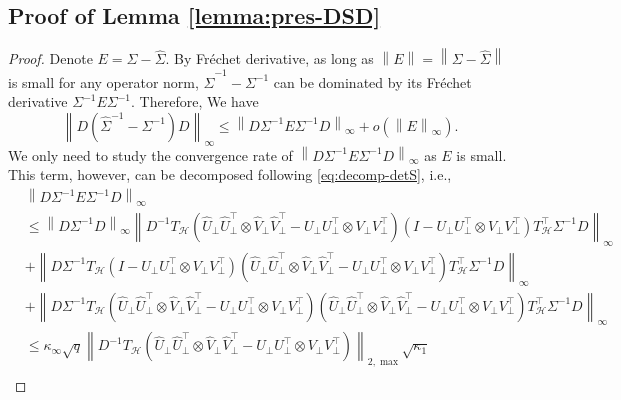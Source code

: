 \documentclass[12pt]{article}
\newcommand{\norm}[1]{\left\lVert#1\right\rVert}
\def\calH{{\mathcal H}}
\theoremstyle{plain}
\begin{document}
\subsection{Proof of Lemma \ref{lemma:pres-DSD} }
\begin{proof}
Denote $E=\Sigma-\widehat{\Sigma}$. By Fréchet derivative, as long as $\norm{E}=\norm{\Sigma-\widehat{\Sigma}}$ is small for any operator norm,  $\widehat{\Sigma}^{-1}-{\Sigma}^{-1}$ can be dominated by its Fréchet derivative ${\Sigma}^{-1}E{\Sigma}^{-1}$. Therefore, We have
\begin{equation*}
            \norm{{D} (\widehat{\Sigma}^{-1}-{\Sigma}^{-1}) {D}}_{\infty}\le \norm{{D}{\Sigma}^{-1}E{\Sigma}^{-1}{D}}_\infty+o(\norm{E}_\infty).
\end{equation*}
We only need to study the convergence rate of $\norm{{D}{\Sigma}^{-1}E{\Sigma}^{-1}{D}}_\infty$ as $E$ is small. This term, however, can be decomposed following \eqref{eq:decomp-detS}, i.e.,
\begin{equation*}
    \begin{aligned}
     & \norm{{D}{\Sigma}^{-1}E{\Sigma}^{-1}{D}}_\infty \\
       & \le  \norm{{D}{\Sigma}^{-1}D}_\infty \norm{D^{-1}
       T_{\calH}\left(\widehat U_\perp \widehat U_\perp^\top \otimes \widehat V_\perp \widehat V_\perp^\top - U_\perp U_\perp^\top \otimes V_\perp V_\perp^\top\right) \left(I-U_\perp U_\perp^\top \otimes V_\perp V_\perp^\top\right) T_{\calH}^\top {\Sigma}^{-1}{D}
       }_{\infty}\\
     & + 
     \norm{{D}{\Sigma}^{-1} T_{\calH}\left(I-U_\perp U_\perp^\top \otimes V_\perp V_\perp^\top\right)\left(\widehat U_\perp \widehat U_\perp^\top \otimes \widehat V_\perp \widehat V_\perp^\top - U_\perp U_\perp^\top \otimes V_\perp V_\perp^\top \right) T_{\calH}^\top {\Sigma}^{-1}{D}
     }_\infty
     \\
     & + \norm{{D}{\Sigma}^{-1}T_{\calH}\left(\widehat U_\perp \widehat U_\perp^\top \otimes \widehat V_\perp \widehat V_\perp^\top - U_\perp U_\perp^\top \otimes V_\perp V_\perp^\top\right) \left(\widehat U_\perp \widehat U_\perp^\top \otimes \widehat V_\perp \widehat V_\perp^\top - U_\perp U_\perp^\top \otimes V_\perp V_\perp^\top\right) T_{\calH}^\top{\Sigma}^{-1}{D}}_\infty \\
     & \le \kappa_\infty \sqrt{q} \norm{ D^{-1}T_{\calH}\left(\widehat U_\perp \widehat U_\perp^\top \otimes \widehat V_\perp \widehat V_\perp^\top - U_\perp U_\perp^\top \otimes V_\perp V_\perp^\top\right) }_{2,\max} \sqrt{\kappa_1} \\

\end{aligned}
\end{equation*}
\end{proof}
\end{document}
